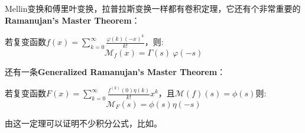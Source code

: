 \begin{remark}
	Mellin变换和傅里叶变换，拉普拉斯变换一样都有卷积定理，它还有个非常重要的\textbf{Ramanujan's Master Theorem}\cite{bougoffa2019note}：
	\begin{theorem}
		若复变函数$f(x)=\sum_{k=0}^\infty\frac{\varphi(k)(-x)^k}{k!}$，则:$$\mathcal{M}_f(x)=\Gamma(s)\mathrm{~}\varphi(-s)$$
	\end{theorem}
	还有一条\textbf{Generalized Ramanujan's Master Theorem}：
	\begin{theorem}
		若复变函数$F(x)=\sum_{k=0}^{\infty}\frac{f^{(k)}\left(0\right)\eta(k)}{k!}x^k$，且$\mathcal{M}(f)(s)=\phi(s)$则:$$\mathcal{M}_F(s)=\phi(s)\eta(-s)$$
	\end{theorem}
	由这一定理可以证明不少积分公式，比如\cite{doi:10.1080/10652469.2014.924114}。
\end{remark}
